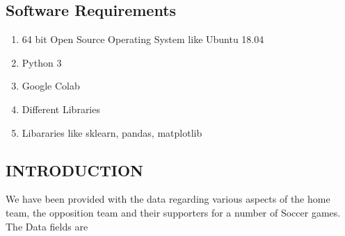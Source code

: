 \documentclass[a4paper, 12pt]{article}
\begin{document}
\subsection{Software Requirements}
\begin{enumerate}
    \item 64 bit Open Source Operating System like Ubuntu 18.04
    \item Python 3
    \item Google Colab
    \item Different Libraries
    \item Libararies like sklearn, pandas, matplotlib
\end{enumerate}
\newpage
\begin{center}
\section{INTRODUCTION}
\end{center}
\hspace{1cm}
\par
We have been provided with the data regarding various aspects of the home team, the opposition team and their supporters for a number of Soccer games.
\\
The Data fields are\\
\end{document}

